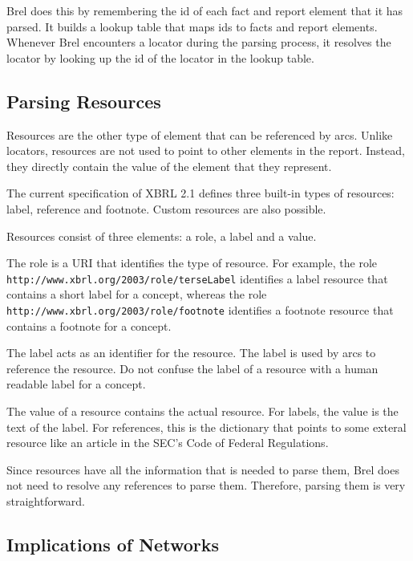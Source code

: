 Brel does this by remembering the id of each fact and report element that it has parsed.
It builds a lookup table that maps ids to facts and report elements.
Whenever Brel encounters a locator during the parsing process, it resolves the locator by looking up the id of the locator in the lookup table.

\subsection{Parsing Resources}

Resources are the other type of element that can be referenced by arcs.
Unlike locators, resources are not used to point to other elements in the report.
Instead, they directly contain the value of the element that they represent.

The current specification of XBRL 2.1 defines three built-in types of resources: label, reference and footnote.
Custom resources are also possible.

Resources consist of three elements: a role, a label and a value.

The role is a URI that identifies the type of resource.
For example, the role \texttt{http://www.xbrl.org/2003/role/terseLabel} identifies a label resource that contains a short label for a concept, 
whereas the role \texttt{http://www.xbrl.org/2003/role/footnote} identifies a footnote resource that contains a footnote for a concept.

The label acts as an identifier for the resource.
The label is used by arcs to reference the resource.
Do not confuse the label of a resource with a human readable label for a concept.

The value of a resource contains the actual resource.
For labels, the value is the text of the label.
For references, this is the dictionary that points to some exteral resource like an article in the SEC's Code of Federal Regulations.

Since resources have all the information that is needed to parse them, Brel does not need to resolve any references to parse them.
Therefore, parsing them is very straightforward.

\subsection{Implications of Networks}

